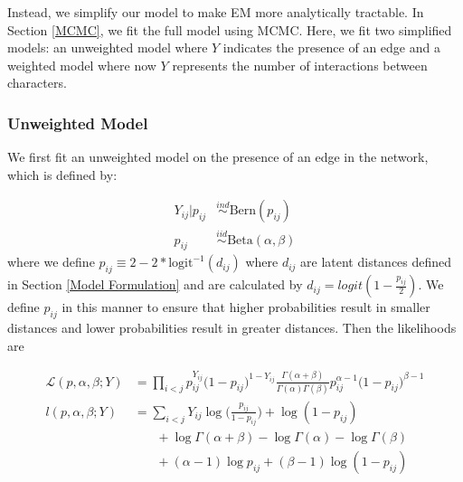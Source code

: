 \documentclass{article}
\begin{document}
Instead, we simplify our model to make EM more analytically tractable. In Section \ref{MCMC}, we fit the full model using MCMC. Here, we fit two simplified models: an unweighted model where $Y$ indicates the presence of an edge and a weighted model where now $Y$ represents the number of interactions between characters.

\subsubsection{Unweighted Model}
We first fit an unweighted model on the presence of an edge in the network, which is defined by:

\begin{align*}
Y_{ij} | p_{ij} &\overset{ind}\sim \text{Bern}(p_{ij}) \\
p_{ij} &\overset{iid}\sim \text{Beta}(\alpha, \beta)
\end{align*}
where we define $p_{ij} \equiv 2-2*\text{logit}^{-1} (d_{ij}) $ where $d_{ij}$ are latent distances defined in Section \ref{Model Formulation} and are calculated by $d_{ij} = logit(1 - \frac{p_{ij}}{2})$. We define $p_{ij}$ in this manner to ensure that higher probabilities result in smaller distances and lower probabilities result in greater distances. Then the likelihoods are 

\begin{align*}
\mathcal{L}(p, \alpha, \beta; Y) &= \prod_{i<j}p_{ij}^{Y_{ij}}\big(1 - p_{ij}\big)^{1 - Y_{ij}} \frac{\Gamma(\alpha + \beta)}{\Gamma(\alpha)\Gamma(\beta)}p_{ij}^{\alpha - 1}\big(1-p_{ij}\big)^{\beta - 1} \\
l(p, \alpha, \beta ; Y) &= \sum_{i<j} Y_{ij}\log \Big(\frac{p_{ij}}{1 - p_{ij}}\Big) + \log(1-p_{ij})  \\
&\ \ \ \ \ \ \ \ + \log \Gamma(\alpha + \beta) - \log \Gamma(\alpha) - \log \Gamma(\beta) \\
&\ \ \ \ \ \ \ \ + (\alpha - 1)\log p_{ij} + (\beta - 1)\log(1 - p_{ij})
\end{align*}

\end{document}
